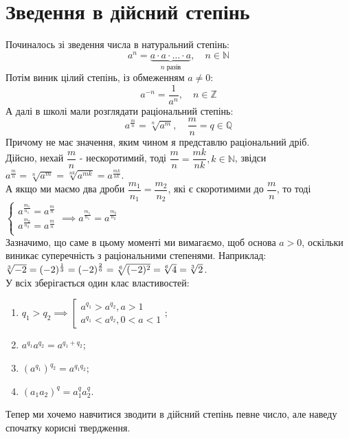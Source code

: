 \documentclass[a4paper, 14pt]{article}
\theoremstyle{theoremdd}
\theoremstyle{theoremdd}
\theoremstyle{theoremdd}
\theoremstyle{theoremdd}
\theoremstyle{theoremdd}
\theoremstyle{theoremdd}
\theoremstyle{theoremdd}
\theoremstyle{theoremdd}
\begin{document}
\section*{Зведення в дійсний степінь}
Починалось зі зведення числа в натуральний степінь:
$$a^n = \underbrace{a \cdot a \cdot \dots \cdot a}_{n\text{ разів}}, \quad n \in \mathbb{N}$$
Потім виник цілий степінь, із обмеженням $a \neq 0$:
$$a^{-n} = \dfrac{1}{a^n}, \quad n \in \mathbb{Z}$$
А далі в школі мали розглядати раціональний степінь:
$$a^{\frac{m}{n}} = \sqrt[n]{a^m}, \quad \dfrac{m}{n} = q \in \mathbb{Q}$$
Причому не має значення, яким чином я представлю раціональний дріб.\\
Дійсно, нехай $\dfrac{m}{n}$ - нескоротимий, тоді $\dfrac{m}{n} = \dfrac{mk}{nk}, k \in \mathbb{N}$, звідси\\
$a^{\frac{m}{n}} = \sqrt[n]{a^m} = \sqrt[nk]{a^{mk}} = a^{\frac{mk}{nk}}$.\\
А якщо ми маємо два дроби $\dfrac{m_1}{n_1} = \dfrac{m_2}{n_2}$, які є скоротимими до $\dfrac{m}{n}$, то тоді\\
$\begin{cases}
a^{\textstyle \frac{m_1}{n_1}} = a^{\textstyle \frac{m}{n}} \\
a^{\textstyle \frac{m_2}{n_2}} = a^{\textstyle \frac{m}{n}} \\
\end{cases} \implies a^{\textstyle \frac{m_1}{n_1}} = a^{\textstyle \frac{m_2}{n_2}}$
\bigskip \\
Зазначимо, що саме в цьому моменті ми вимагаємо, щоб основа $a > 0$, оскільки виникає суперечність з раціональними степенями. Наприклад:\\
$\sqrt[\leftroot{2} 3]{-2} = (-2)^{\frac{1}{3}} = (-2)^{\frac{2}{6}} = \sqrt[6]{(-2)^2} = \sqrt[\leftroot{2} 6]{4} = \sqrt[\leftroot{2} 3]{2}$.
\bigskip \\
У всіх зберігається один клас властивостей:
\begin{enumerate}[nosep,wide=0pt,label={\arabic*)}]
\item $q_1 > q_2 \implies \left[ \begin{gathered} a^{q_1} > a^{q_2}, a>1 \\ a^{q_1} < a^{q_2}, 0<a<1 \end{gathered} \right.$;
\item $a^{q_1} a^{q_2} = a^{q_1+q_2}$;
\item $(a^{q_1})^{q_2} = a^{q_1q_2}$;
\item $(a_1 a_2)^{q} = a_1^q a_2^q$.
\end{enumerate}
Тепер ми хочемо навчитися зводити в дійсний степінь певне число, але наведу спочатку корисні твердження.
\end{document}
